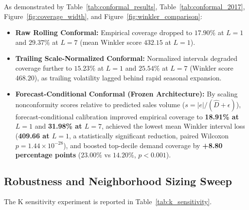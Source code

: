 \documentclass[11pt,a4paper]{article}
\begin{document}
As demonstrated by Table~\ref{tab:conformal_results}, Table~\ref{tab:conformal_2017}, Figure~\ref{fig:coverage_width}, and Figure~\ref{fig:winkler_comparison}:
\begin{itemize}
    \item \textbf{Raw Rolling Conformal:} Empirical coverage dropped to $17.90\%$ at $L=1$ and $29.37\%$ at $L=7$ (mean Winkler score $432.15$ at $L=1$).
    \item \textbf{Trailing Scale-Normalized Conformal:} Normalized intervals degraded coverage further to $15.23\%$ at $L=1$ and $25.54\%$ at $L=7$ (Winkler score $468.20$), as trailing volatility lagged behind rapid seasonal expansion.
    \item \textbf{Forecast-Conditional Conformal (Frozen Architecture):} By scaling nonconformity scores relative to predicted sales volume ($s = |e| / (\hat{D} + \epsilon)$), forecast-conditional calibration improved empirical coverage to \textbf{18.91\% at $L=1$} and \textbf{31.98\% at $L=7$}, achieved the lowest mean Winkler interval loss (\textbf{409.66 at $L=1$}, a statistically significant reduction, paired Wilcoxon $p = 1.44 \times 10^{-28}$), and boosted top-decile demand coverage by \textbf{+8.80 percentage points} ($23.00\%$ vs $14.20\%$, $p < 0.001$).
\end{itemize}

\subsection{Robustness and Neighborhood Sizing Sweep}
\label{sec:res_robustness}
The K sensitivity experiment is reported in Table~\ref{tab:k_sensitivity}.
\end{document}
